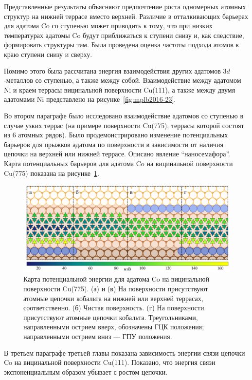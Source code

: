 \documentclass[10pt]{book}
\begin{document}
Представленные результаты объясняют предпочтение роста одномерных атомных структур на нижней террасе вместо верхней. Различие в отталкивающих барьерах для адатома Co со ступенью может приводить к тому, что при низких температурах адатомы Co будут приближаться к ступени снизу и, как следствие, формировать структуры там. Была проведена оценка частоты подхода атомов к краю ступени снизу и сверху.

Помимо этого была рассчитана энергия взаимодействия других адатомов $3d$-металлов со ступенью, а также между собой. Взаимодействие между адатомом Ni и краем террасы вицинальной поверхности Cu(111), а также между двумя адатомами Ni представлено на рисунке~\ref{fig:mplb2016-23}.

Во втором параграфе было исследовано взаимодействие адатомов со ступенью в случае узких террас (на примере поверхности Cu(775), террасы которой состоят из 6 атомных рядов). Было продемонстрировано изменение потенциальных барьеров для прыжков адатома по поверхности в зависимости от наличия цепочки на верхней или нижней террасе. Описано явление ``наносемафора''. Карта потенциальных барьеров для адатома Co на вицинальной поверхности Cu(775) показана на рисунке~\ref{fig:potentials}.

\begin{figure}[t]
	\centering
	\includegraphics[width=\linewidth]{fig/map_1_h____tri-p.pdf}
	\caption{Карта потенциальной энергии для адатома Co на вицинальной поверхности Cu(775).
		(а) и (в) На поверхности присутствуют атомные цепочки кобальта на нижней или верхней террасах, соответственно.
		(б) Чистая поверхность.
		(г) На поверхности присутствуют атомные цепочки кобальта.
		Треугольниками, направленными острием вверх, обозначены ГЦК положения; направленными острием вниз --- ГПУ положения.}
	\label{fig:potentials}
\end{figure}

В третьем параграфе третьей главы показана зависимость энергии связи цепочки Co на вицинальной поверхности Cu(111). Показано, что энергия связи экспоненциальным образом убывает с ростом цепочки.
\end{document}
